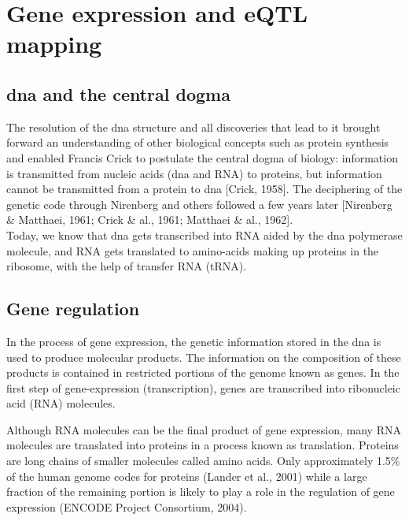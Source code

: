 \newpage

\section{Gene expression and eQTL mapping}  %

\subsection{\gls{dna} and the central dogma}
The resolution of the \gls{dna} structure and all discoveries that lead to it brought forward an understanding of other biological concepts such as protein synthesis and enabled Francis Crick to postulate the central dogma of biology: information is transmitted from nucleic acids (\gls{dna} and RNA) to proteins, but information cannot be transmitted from a protein to \gls{dna} [Crick, 1958]. 
The deciphering of the genetic code through Nirenberg and others followed a few years later [Nirenberg \& Matthaei, 1961; Crick \& al., 1961; Matthaei \& al., 1962].\\

Today, we know that \gls{dna} gets transcribed into RNA aided by the \gls{dna} polymerase molecule, and RNA gets translated to amino-acids making up proteins in the ribosome, with the help of transfer RNA (tRNA).

\subsection{Gene regulation}

In the process of gene expression, the genetic information stored in the \gls{dna} is used to produce molecular products. 
The information on the composition of these products is contained in restricted portions of the genome known as genes. 
In the first step of gene-expression (transcription), genes are transcribed into ribonucleic acid (RNA) molecules. 

Although RNA molecules can be the final product of gene expression, many RNA molecules are translated into proteins in a process known as translation. 
Proteins are long chains of smaller molecules called amino acids. 
Only approximately 1.5\% of the human genome codes for proteins (Lander et al., 2001) while a large fraction of the remaining portion is likely to play a role in the regulation of gene expression (ENCODE Project Consortium, 2004). 

